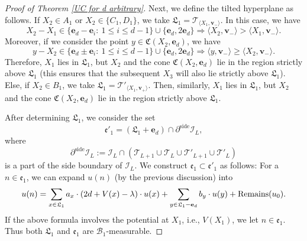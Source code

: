 \documentclass[11pt,reqno,UTF8,twoside]{amsart}
\newcommand{\bfv}{\mathbf{v}}
\newcommand{\bfe}{\mathbf{e}}
\newcommand{\mcB}{\mathcal{B}}
\newcommand{\mcI}{\mathcal{I}}
\newcommand{\mcT}{\mathcal{T}}
\newcommand{\partialside}{\partial^{\text{side}}}
\newtheorem{rmk}{\bf Remark}[section]
\theoremstyle{definition}
\numberwithin{equation}{section}
\begin{document}
\begin{proof}[Proof of Theorem \ref{UC for d arbitrary}]
Next, we define the tilted hyperplane as follows. If $X_2\in A_1$ or $X_2\in \{C_1,D_1\}$, we take $\mathfrak{L}_1 =\mcT_{\langle X_1,\bfv_-\rangle}$. In this case, we have 
\[X_2-X_1\in \{\bfe_d-\bfe_i: \ 1\leq i\leq d-1 \} \cup \{\bfe_d,2\bfe_d\}\Rightarrow \langle X_2,\bfv_-\rangle  > \langle X_1,\bfv_-\rangle.\]
Moreover, if we consider the point $y\in \mathfrak{C}(X_2,\bfe_d)$, we have 
\[y-X_2\in \{\bfe_d \pm\bfe_i: \ 1\leq i\leq d-1 \} \cup \{\bfe_d,2\bfe_d\}\Rightarrow \langle y,\bfv_-\rangle  \geq  \langle X_2,\bfv_-\rangle.\]
Therefore, $X_1$ lies in $\mathfrak{L}_1$, but $X_2$ and the cone $\mathfrak{C}(X_2,\bfe_d)$ lie in the region strictly above $\mathfrak{L}_1$ (this ensures that the subsequent $X_3$ will also lie strictly above $\mathfrak{L}_1$). Else, if $X_2\in B_1$, we take $\mathfrak{L}_1 =\mcT'_{\langle X_1,\bfv_+\rangle}$.
Then, similarly, $X_1$ lies in $\mathfrak{L}_1$, but $X_2$ and the cone $\mathfrak{C}(X_2,\bfe_d)$ lie in the region strictly above $\mathfrak{L}_1$.

After determining $\mathfrak{L}_1$, we consider the set 
\[\mathfrak{e}'_1 = (\mathfrak{L}_1+\bfe_d) \cap \partialside \mcI_L,\]
where 
 \[ \partialside \mcI_L := \mcI_L \cap (\mcT_{L+1}\cup \mcT_{L}\cup \mcT'_{L+1}\cup \mcT'_{L} )\]
is a part of the side boundary of $\mcI_L$. We construct $\mathfrak{e}_1\subset \mathfrak{e}'_1$ as follows: For a $n\in \mathfrak{e}_1$, we can expand $u(n)$ (by the previous discussion) into   
\[u(n)= \sum_{x\in \mathfrak{L}_1} a_x \cdot (2d+V(x)-\lambda) \cdot u(x)  +\sum_{y\in \mathfrak{L}_1-\bfe_d} b_y \cdot u(y) + {\rm Remains}(u_0).\]
If the above formula involves the potential at $X_1$, i.e.,  $V(X_1)$, we let $n\in \mathfrak{e}_1$.
{Thus both $\mathfrak{L}_1$ and $\mathfrak{e}_1$ are $\mcB_1$-measurable.} 




\end{proof}
\end{document}
